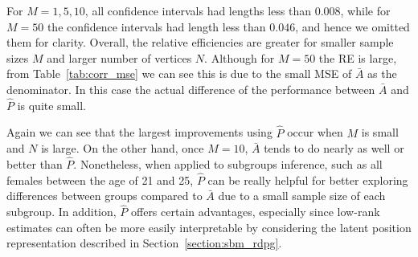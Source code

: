 \documentclass[10pt,letterpaper]{article}
\renewcommand{\hat}{\widehat}
\begin{document}
For $M = 1, 5, 10$, all confidence intervals had lengths less than $0.008$, while for $M=50$ the confidence intervals had length less than $0.046$, and hence we omitted them for clarity.
    Overall, the relative efficiencies are greater for smaller sample sizes $M$ and larger number of vertices $N$. Although for $M=50$ the RE is large, from Table~\ref{tab:corr_mse} we can see this is due to the small MSE of $\bar{A}$ as the denominator. In this case the actual difference of the performance between $\bar{A}$ and $\hat{P}$ is quite small.

Again we can see that the largest improvements using $\hat{P}$ occur when $M$ is small and $N$ is large. 
On the other hand, once $M=10$, $\bar{A}$ tends to do nearly as well or better than $\hat{P}$. 
Nonetheless, when applied to subgroups inference, such as all females between the age of 21 and 25, $\hat{P}$ can be really helpful for better exploring differences between groups compared to $\bar{A}$ due to a small sample size of each subgroup.
In addition, $\hat{P}$ offers certain advantages, especially since low-rank estimates can often be more easily interpretable by considering the latent position representation described in Section~\ref{section:sbm_rdpg}.
\end{document}
